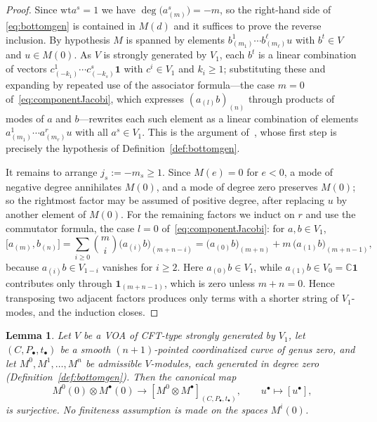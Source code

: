 \documentclass[12pt,a4paper,reqno]{amsart}
\numberwithin{equation}{section}
\newtheorem{lemma}[theorem]{Lemma}
\theoremstyle{definition}
\newcommand{\C}{\mathbb{C}}
\def\vac{\mathbf{1}}
\def\o{\otimes}
\def\wt{\mathrm{wt}}
\def\ds{\dots}
\begin{document}
\begin{proof}
Since $\wt a^s=1$ we have $\deg\big(a^s_{(m)}\big)=-m$, so the right-hand side of
\eqref{eq:bottomgen} is contained in $M(d)$ and it suffices to prove the reverse
inclusion. By hypothesis $M$ is spanned by elements $b^1_{(m_1)}\cdots b^\ell_{(m_\ell)}u$
with $b^t\in V$ and $u\in M(0)$. As $V$ is strongly generated by $V_1$, each $b^t$ is a
linear combination of vectors $c^1_{(-k_1)}\cdots c^{s}_{(-k_{s})}\vac$ with $c^i\in V_1$
and $k_i\geq 1$; substituting these and expanding by repeated use of the associator
formula---the case $m=0$ of~\eqref{eq:componentJacobi}, which expresses $(a_{(l)}b)_{(n)}$ through products of modes of $a$ and $b$---rewrites each such
element as a linear combination of elements $a^1_{(m_1)}\cdots a^r_{(m_r)}u$ with all
$a^s\in V_1$. This is the argument of~\cite[Lemma 4.0.1]{DG}, whose first step is
precisely the hypothesis of Definition~\ref{def:bottomgen}.

It remains to arrange $j_s:=-m_s\geq 1$. Since $M(e)=0$ for $e<0$, a mode of negative
degree annihilates $M(0)$, and a mode of degree zero preserves $M(0)$; so the rightmost
factor may be assumed of positive degree, after replacing $u$ by another element of
$M(0)$. For the remaining factors we induct on $r$ and use the commutator formula, the
case $l=0$ of~\eqref{eq:componentJacobi}: for $a,b\in V_1$,
\[
\big[a_{(m)},b_{(n)}\big]=\sum_{i\geq 0}\binom{m}{i}\big(a_{(i)}b\big)_{(m+n-i)}
=\big(a_{(0)}b\big)_{(m+n)}+m\,\big(a_{(1)}b\big)_{(m+n-1)},
\]
because $a_{(i)}b\in V_{1-i}$ vanishes for $i\geq 2$. Here $a_{(0)}b\in V_1$, while
$a_{(1)}b\in V_0=\C\vac$ contributes only through $\vac_{(m+n-1)}$, which is zero unless
$m+n=0$. Hence transposing two adjacent factors produces only terms with a shorter
string of $V_1$-modes, and the induction closes.
\end{proof}

\begin{lemma}\label{lm:DG1}
Let $V$ be a VOA of CFT-type strongly generated by $V_1$, let $(C,P_\bullet,t_\bullet)$
be a smooth $(n+1)$-pointed coordinatized curve of genus zero, and let
$M^0,M^1,\ds,M^n$ be admissible $V$-modules, each generated in degree zero
(Definition~\ref{def:bottomgen}). Then the canonical map
\[
M^0(0)\o M^\bullet(0)\longrightarrow [M^0\o M^\bullet]_{(C,P_\bullet,t_\bullet)},\qquad
u^\bullet\mapsto [u^\bullet],
\]
is surjective. No finiteness assumption is made on the spaces $M^i(0)$.
\end{lemma}
\end{document}

